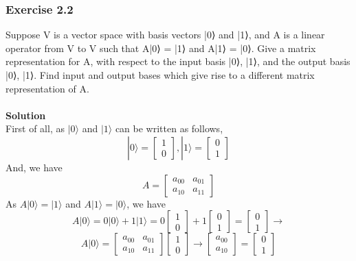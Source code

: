 \documentclass{article}
\begin{document}
\subsubsection{Exercise 2.2}
Suppose V is a vector space with basis vectors |0⟩ and |1⟩, 
and A is a linear operator from V to V such that A|0⟩ = |1⟩ and A|1⟩ = |0⟩. 
Give a matrix representation for A, with respect to the input basis |0⟩, |1⟩, and the output basis |0⟩, |1⟩. 
Find input and output bases which give rise to a different matrix representation of A. \\ \\
\textbf{Solution} \\
First of all, as $|0\rangle$ and $|1\rangle$ can be written as follows, \\
\begin{equation}
    |0\rangle = 
    \begin{bmatrix}
        1 \\
        0
    \end{bmatrix}
    , |1\rangle = 
    \begin{bmatrix}
        0 \\
        1
    \end{bmatrix}
\end{equation}
And, we have 
\begin{equation}
        A =
        \begin{bmatrix}
            a_{00} & a_{01} \\
            a_{10} & a_{11}
    \end{bmatrix}
\end{equation}
As $A|0\rangle = |1\rangle$ and $A|1\rangle = |0\rangle$, we have
\begin{equation}
    A|0\rangle = 
    0|0\rangle + 1|1\rangle
    =
    0
    \begin{bmatrix}
        1 \\
        0
    \end{bmatrix}
    +
    1
    \begin{bmatrix}
        0 \\
        1
    \end{bmatrix} 
    =
    \begin{bmatrix}
        0 \\
        1
    \end{bmatrix}
    \rightarrow
\end{equation}
\begin{equation}
    A|0\rangle =
    \begin{bmatrix}
        a_{00} & a_{01} \\
        a_{10} & a_{11}
    \end{bmatrix}
    \begin{bmatrix}
        1 \\
        0
    \end{bmatrix}
    \rightarrow
    \begin{bmatrix}
        a_{00} \\
        a_{10}
    \end{bmatrix}
    =
    \begin{bmatrix}
        0 \\
        1
    \end{bmatrix}
\end{equation}
\end{document}
